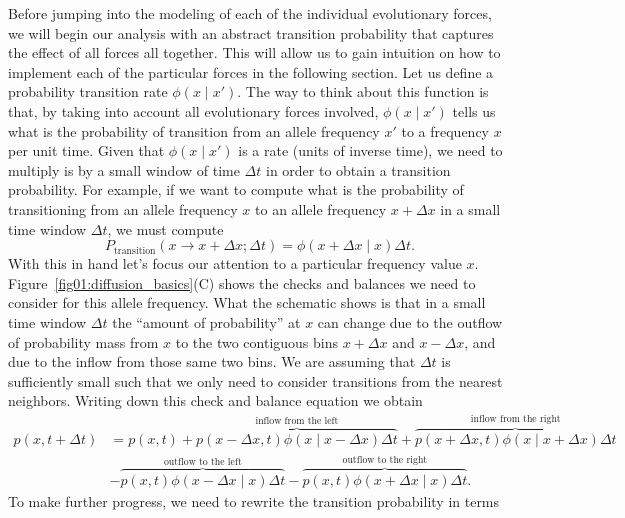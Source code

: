 Before jumping into the modeling of each of the individual evolutionary forces,
we will begin our analysis with an abstract transition probability that captures
the effect of all forces all together. This will allow us to gain intuition on
how to implement each of the particular forces in the following section. Let us
define a probability transition rate $\phi(x \mid x')$. The way to think about
this function is that, by taking into account all evolutionary forces involved,
$\phi(x \mid x')$ tells us what is the probability of transition from an allele
frequency $x'$ to a frequency $x$ per unit time. Given that $\phi(x \mid x')$ is
a rate (units of inverse time), we need to multiply is by a small window of time
$\Delta t$ in order to obtain a transition probability. For example, if we want
to compute what is the probability of transitioning from an allele frequency $x$
to an allele frequency $x + \Delta x$ in a small time window $\Delta t$, we must
compute
\begin{equation}
    P_{\text{transition}}(x \rightarrow x + \Delta x; \Delta t) = 
    \phi(x + \Delta x \mid x) \Delta t.
\end{equation}
With this in hand let's focus our attention to a particular frequency value $x$.
Figure~\ref{fig01:diffusion_basics}(C) shows the checks and balances we need to
consider for this allele frequency. What the schematic shows is that in a small
time window $\Delta t$ the ``amount of probability'' at $x$ can change due to
the outflow of probability mass from $x$ to the two contiguous bins $x + \Delta
x$ and $x - \Delta x$, and due to the inflow from those same two bins. We are
assuming that $\Delta t$ is sufficiently small such that we only need to
consider transitions from the nearest neighbors. Writing down this check and
balance equation we obtain
\begin{equation}
\begin{split}
    p(x, t + \Delta t) &= p(x, t)
    + \overbrace{p(x - \Delta x, t) \phi(x \mid x - \Delta x)\Delta t}
    ^{\text{inflow from the left}}
    + \overbrace{p(x + \Delta x, t) \phi(x \mid x + \Delta x)\Delta t}
    ^{\text{inflow from the right}}\\
    &- \overbrace{p(x, t) \phi(x - \Delta x \mid x) \Delta t}
    ^{\text{outflow to the left}}
    - \overbrace{p(x, t) \phi(x + \Delta x \mid x) \Delta t}
    ^{\text{outflow to the right}}.
\end{split}
\label{eq:inflow_outflow_diffusion}
\end{equation}
To make further progress, we need to rewrite the transition probability in terms

